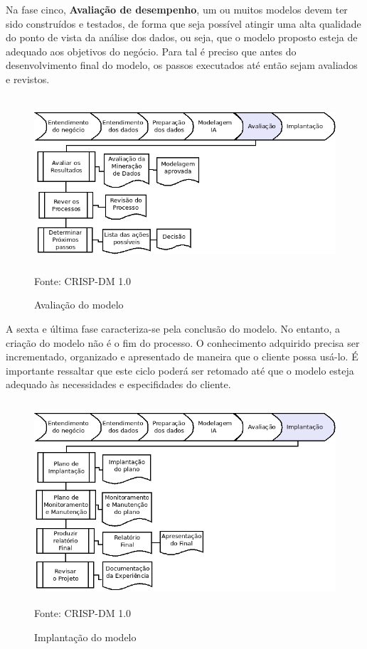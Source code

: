 \pagebreak

Na fase cinco, \textbf{Avaliação de desempenho}, um ou muitos modelos devem ter sido construídos e testados, 
de forma que seja possível atingir uma alta qualidade do ponto de vista da análise dos dados, ou seja, que o 
modelo proposto esteja de adequado aos objetivos do negócio. Para tal é preciso que antes do desenvolvimento final 
do modelo, os passos executados até então sejam avaliados e revistos.

\begin{figure}[!ht]
\centering
\caption{Avaliação do modelo}
\vspace{1mm}
\includegraphics[width=120mm, height=65mm]{Figuras/Cronograma/Avaliacao.png}\\
\tiny Fonte: CRISP-DM 1.0
\end{figure}

\pagebreak

A sexta e última fase caracteriza-se pela conclusão do modelo. No entanto, a criação do modelo não é o fim do processo.
O conhecimento adquirido precisa ser incrementado, organizado e apresentado de maneira que o cliente possa usá-lo.
É importante ressaltar que este ciclo poderá ser retomado até que o modelo esteja adequado às necessidades e especifidades do cliente.

\begin{figure}[!ht]
\centering
\caption{Implantação do modelo}
\vspace{1mm}
\includegraphics[width=120mm, height=75mm]{Figuras/Cronograma/Implantacao.png}\\
\tiny Fonte: CRISP-DM 1.0
\end{figure}

